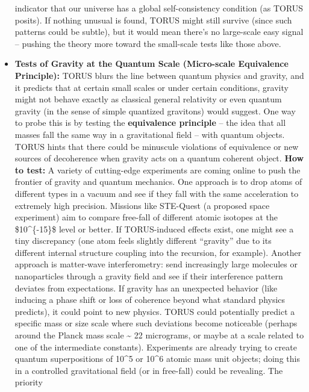 \documentclass[
]{article}
\begin{document}
\begin{itemize}
  indicator that our universe has a global self-consistency condition
  (as TORUS posits). If nothing unusual is found, TORUS might still
  survive (since such patterns could be subtle), but it would mean
  there's no large-scale easy signal -- pushing the theory more toward
  the small-scale tests like those above.
\item
  \textbf{Tests of Gravity at the Quantum Scale (Micro-scale Equivalence
  Principle):} TORUS blurs the line between quantum physics and gravity,
  and it predicts that at certain small scales or under certain
  conditions, gravity might not behave exactly as classical general
  relativity or even quantum gravity (in the sense of simple quantized
  gravitons) would suggest. One way to probe this is by testing the
  \textbf{equivalence principle} -- the idea that all masses fall the
  same way in a gravitational field -- with quantum objects. TORUS hints
  that there could be minuscule violations of equivalence or new sources
  of decoherence when gravity acts on a quantum coherent object.
  \textbf{How to test:} A variety of cutting-edge experiments are coming
  online to push the frontier of gravity and quantum mechanics. One
  approach is to drop atoms of different types in a vacuum and see if
  they fall with the same acceleration to extremely high precision.
  Missions like STE-Quest (a proposed space experiment) aim to compare
  free-fall of different atomic isotopes at the \$10\^{}\{-15\}\$ level
  or better\hspace{0pt}. If TORUS-induced effects exist, one might see a
  tiny discrepancy (one atom feels slightly different ``gravity'' due to
  its different internal structure coupling into the recursion, for
  example). Another approach is matter-wave interferometry: send
  increasingly large molecules or nanoparticles through a gravity field
  and see if their interference pattern deviates from expectations. If
  gravity has an unexpected behavior (like inducing a phase shift or
  loss of coherence beyond what standard physics predicts), it could
  point to new physics. TORUS could potentially predict a specific mass
  or size scale where such deviations become noticeable (perhaps around
  the Planck mass scale \textasciitilde{} 22 micrograms, or maybe at a
  scale related to one of the intermediate constants). Experiments are
  already trying to create quantum superpositions of 10\^{}5 or 10\^{}6
  atomic mass unit objects; doing this in a controlled gravitational
  field (or in free-fall) could be revealing\hspace{0pt}. The priority

\end{itemize}
\end{document}
